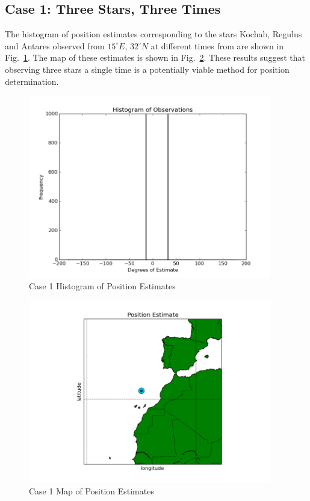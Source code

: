 \documentclass[12pt,a4paper]{book}
\begin{document}
\subsection*{Case 1:  Three Stars, Three Times}
The histogram of position estimates corresponding to the stars Kochab, Regulus and Antares observed from $15^{\circ} E$, $32^{\circ} N$ at different times from  are shown in Fig.~\ref{f:3s3t_z_z}.  The map of these estimates is shown in Fig.~\ref{f:3s3t_z_z_map}.  These results suggest that observing three stars a single time is a potentially viable method for position determination.
\begin{figure}[!h]%
\centering
\includegraphics[height=8cm]{3s3t_z_z.png}
\caption{Case 1 Histogram of Position Estimates}
\label{f:3s3t_z_z}
\end{figure}
\begin{figure}[!h]%
\centering
\includegraphics[height=8cm]{3s3t_z_z_map.png}
\caption{Case 1 Map of Position Estimates}
\label{f:3s3t_z_z_map}
\end{figure}
\FloatBarrier
\end{document}
